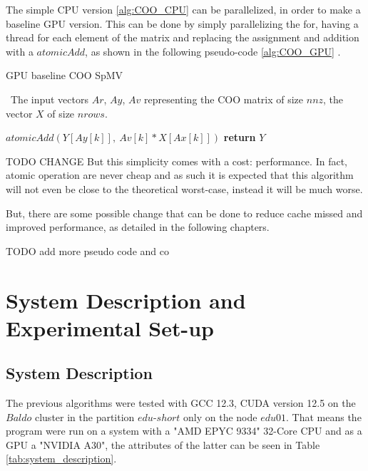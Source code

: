 \documentclass[conference]{IEEEtran}
\newcommand{\todo}[1]{\color{red} TODO #1\color{black}}
\begin{document}
The simple CPU version \ref{alg:COO_CPU} can be parallelized, in order to make a baseline GPU version. This can be done by simply parallelizing the for, having a thread for each element of the matrix and replacing the assignment and addition with a $atomicAdd$, as shown in the following pseudo-code \ref{alg:COO_GPU} .

\begin{algorithm}[h!]
	\caption{GPU baseline COO SpMV}
	\algorithmicrequire~The input vectors $Ar$, $Ay$, $Av$ representing the COO matrix of size $nnz$, the vector $X$ of size $nrows$.
	\begin{algorithmic}[1]
		\State $atomicAdd(Y[Ay[k]],\ Av[k] * X[Ax[k]]) $\label{partitioning}
		\EndFor
		\State \textbf{return} $Y$
		\EndProcedure
	\end{algorithmic}
	\label{alg:COO_GPU}
\end{algorithm}

\todo{CHANGE But this simplicity comes with a cost: performance. In fact, atomic operation are never cheap and as such it is expected that this algorithm will not even be close to the theoretical worst-case, instead it will be much worse.

But, there are some possible change that can be done to reduce cache missed and improved performance, as detailed in the following chapters.}

\todo {add more pseudo code and co}

\section{System Description and Experimental Set-up}

\subsection{System Description}

The previous algorithms were tested with GCC 12.3, CUDA version 12.5 on the $Baldo$ cluster in the partition $edu$-$short$ only on the node $edu01$. That means the program were run on a system with a "AMD EPYC 9334" 32-Core CPU and as a GPU a "NVIDIA A30", the attributes of the latter can be seen in Table \ref{tab:system_description}.
\end{document}
